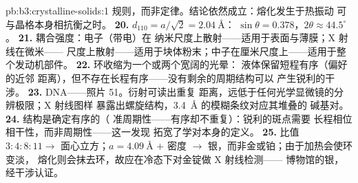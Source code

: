 \begin{solution}{pb:b3:crystalline-solids:1}
规则，而非定律。结论依然成立：熔化发生于热振动
可与晶格本身相抗衡之时。
\textbf{20.} $d_{110} = a/\sqrt2 = \qty{2.04}{\angstrom}$：
$\sin\theta = 0.378$，$2\theta \approx 44.5^\circ$。
\textbf{21.} 耦合强度：电子（带电）在
纳米尺度上散射——适用于表面与薄膜；X 射线在微米——
尺度上散射——适用于块体粉末；中子在厘米尺度上——适用于整个发动机部件。
\textbf{22.} 环收缩为一个或两个宽阔的光晕：
液体保留短程有序（偏好的近邻
距离），但不存在长程有序——没有剩余的周期结构可以
产生锐利的干涉。
\textbf{23.} DNA——照片 51。衍射可读出重复
距离，远低于任何光学显微镜的分辨极限；X 射线图样
暴露出螺旋结构，\qty{3.4}{\angstrom} 的模糊条纹对应其堆叠的
碱基对。
\textbf{24.} 结构是确定有序的（
准周期性——有序却不重复）：锐利的斑点需要
长程相位相干性，而非周期性——这一发现
拓宽了学对本身的定义。
\textbf{25.} 比值 $3:4:8:11 \to$ 面心立方；$a = \qty{4.09}{\angstrom}$
$+$ 密度 $\to$ 银，而非金或铂；由于加热会使环变淡，
熔化则会抹去环，故应在冷态下对金锭做 X 射线检测——
博物馆的银，经干涉认证。
\end{solution}
